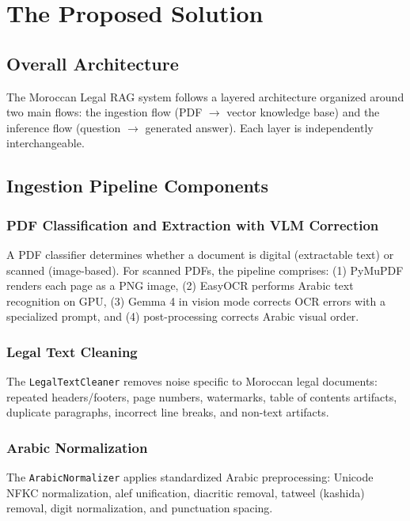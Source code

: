 \section{The Proposed Solution}

\subsection{Overall Architecture}

The Moroccan Legal RAG system follows a layered architecture organized
around two main flows: the ingestion flow (PDF $\rightarrow$ vector
knowledge base) and the inference flow (question $\rightarrow$ generated
answer). Each layer is independently interchangeable.

\subsection{Ingestion Pipeline Components}

\subsubsection{PDF Classification and Extraction with VLM Correction}

A PDF classifier determines whether a document is digital (extractable
text) or scanned (image-based). For scanned PDFs, the pipeline comprises:
(1) PyMuPDF renders each page as a PNG image, (2) EasyOCR performs Arabic
text recognition on GPU, (3) Gemma 4 in vision mode corrects OCR errors
with a specialized prompt, and (4) post-processing corrects Arabic
visual order.

\subsubsection{Legal Text Cleaning}

The \texttt{LegalTextCleaner} removes noise specific to Moroccan legal
documents: repeated headers/footers, page numbers, watermarks, table of
contents artifacts, duplicate paragraphs, incorrect line breaks, and
non-text artifacts.

\subsubsection{Arabic Normalization}

The \texttt{ArabicNormalizer} applies standardized Arabic preprocessing:
Unicode NFKC normalization, alef unification, diacritic removal,
tatweel (kashida) removal, digit normalization, and punctuation spacing.

